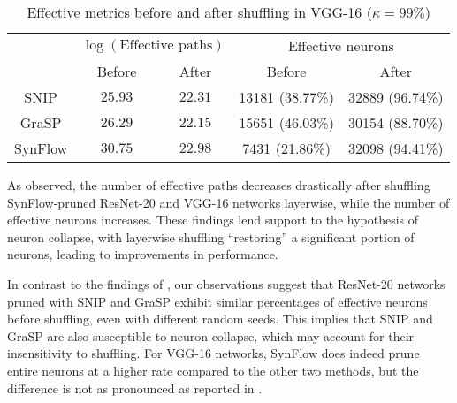\begin{table}[h!]
\centering
\begin{tabular}{|c|cc|cc|}
\hline
        & \multicolumn{2}{c|}{$\log(\text{Effective paths})$} & \multicolumn{2}{c|}{Effective neurons} \\ \cline{2-5} 
        & Before            & After            & Before             & After             \\ \hline
SNIP    & $25.93$         & $22.31$        & 13181 (38.77\%)      & 32889 (96.74\%)    \\ \hline
GraSP   & $26.29$         & $22.15$        & 15651 (46.03\%)     & 30154 (88.70\%)    \\ \hline
SynFlow & $30.75$         & $22.98$        & 7431 (21.86\%)     & 32098 (94.41\%)    \\ \hline
\end{tabular}
\caption{Effective metrics before and after shuffling in VGG-16 ($\kappa=99\%$)}
\label{table:vgg16-99}
\end{table}
As observed, the number of effective paths decreases drastically after shuffling SynFlow-pruned ResNet-20 and VGG-16 networks layerwise, while the number of effective neurons increases. These findings lend support to the hypothesis of neuron collapse, with layerwise shuffling ``restoring'' a significant portion of neurons, leading to improvements in performance.

In contrast to the findings of \textcite{frankle21}, our observations suggest that ResNet-20 networks pruned with SNIP and GraSP exhibit similar percentages of effective neurons before shuffling, even with different random seeds. This implies that SNIP and GraSP are also susceptible to neuron collapse, which may account for their insensitivity to shuffling. For VGG-16 networks, SynFlow does indeed prune entire neurons at a higher rate compared to the other two methods, but the difference is not as pronounced as reported in \textcite{frankle21}.

